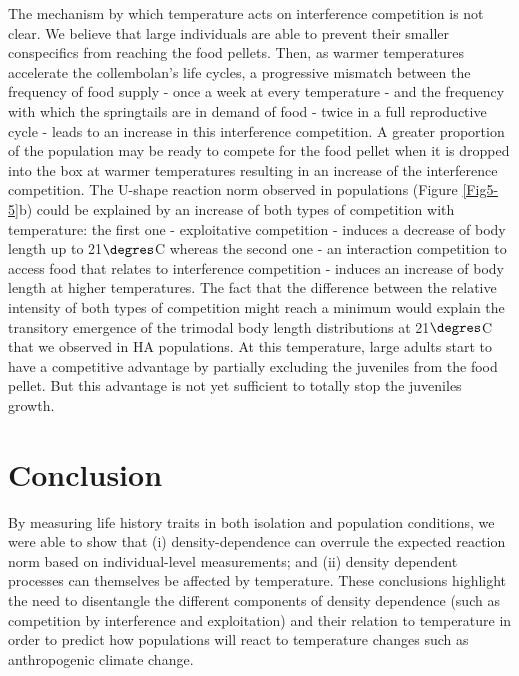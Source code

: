 The mechanism by which temperature acts on interference competition is not
clear. We believe that large individuals are able to prevent their smaller
conspecifics from reaching the food pellets. Then, as warmer temperatures
accelerate the collembolan’s life cycles, a progressive mismatch between the
frequency of food supply - once a week at every temperature - and the frequency
with which the springtails are in demand of food - twice in a full reproductive
cycle \autocites{palevody1974a} - leads to an increase in this
interference competition.
A greater proportion of the population may be ready to compete for the food pellet
when it is dropped into the box at warmer temperatures resulting in an increase
of the interference competition. The U-shape reaction norm observed in
populations (Figure \ref{Fig5-5}b) could be explained by an increase of both
types of competition with temperature: the first one - exploitative competition - induces
a decrease of body length up to 21$\degres$C whereas the second one - an interaction
competition to access food that relates to interference competition - induces an
increase of body length at higher temperatures. The fact that the difference
between the relative intensity of both types of competition might reach a
minimum would explain the transitory emergence of the trimodal body length
distributions at 21$\degres$C that we observed in HA populations. At this
temperature,
large adults start to have a competitive advantage by partially excluding the
juveniles from the food pellet. But this advantage is not yet sufficient to
totally stop the juveniles growth.


\section{Conclusion}

By measuring life history traits in both isolation and population conditions, we
were able to show that (i) density-dependence can overrule the expected reaction
norm based on individual-level measurements; and (ii) density dependent
processes can themselves be affected by temperature. These conclusions highlight
the need to disentangle the different components of density dependence (such as
competition by interference and exploitation) and their relation to temperature
in order to predict how populations will react to temperature changes such as
anthropogenic climate change.



















